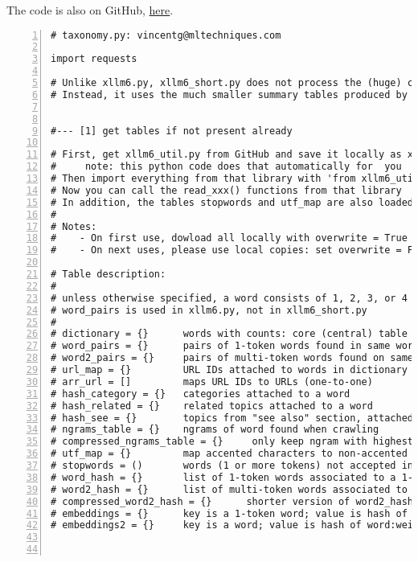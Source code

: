 \documentclass[oneside,10pt]{book}
\begin{document}
The code is also on GitHub, \href{https://github.com/VincentGranville/Large-Language-Models/blob/main/xllm6/build-taxonomy/taxonomy.py}{here}.
\vspace{1ex}

\begin{lstlisting}[numbers=left]
# taxonomy.py: vincentg@mltechniques.com

import requests

# Unlike xllm6.py, xllm6_short.py does not process the (huge) crawled data.
# Instead, it uses the much smaller summary tables produced by xllm6.py


#--- [1] get tables if not present already

# First, get xllm6_util.py from GitHub and save it locally as xllm6_util.py
#     note: this python code does that automatically for  you
# Then import everything from that library with 'from xllm6_util import *'
# Now you can call the read_xxx() functions from that library
# In addition, the tables stopwords and utf_map are also loaded
#
# Notes:
#    - On first use, dowload all locally with overwrite = True
#    - On next uses, please use local copies: set overwrite = False 

# Table description: 
#
# unless otherwise specified, a word consists of 1, 2, 3, or 4 tokens
# word_pairs is used in xllm6.py, not in xllm6_short.py
#
# dictionary = {}      words with counts: core (central) table
# word_pairs = {}      pairs of 1-token words found in same word, with count
# word2_pairs = {}     pairs of multi-token words found on same URL, with count 
# url_map = {}         URL IDs attached to words in dictionary
# arr_url = []         maps URL IDs to URLs (one-to-one)
# hash_category = {}   categories attached to a word
# hash_related = {}    related topics attached to a word
# hash_see = {}        topics from "see also" section, attached to word
# ngrams_table = {}    ngrams of word found when crawling
# compressed_ngrams_table = {}     only keep ngram with highest count
# utf_map = {}         map accented characters to non-accented version
# stopwords = ()       words (1 or more tokens) not accepted in dictionary
# word_hash = {}       list of 1-token words associated to a 1-token word 
# word2_hash = {}      list of multi-token words associated to a multi-token word 
# compressed_word2_hash = {}      shorter version of word2_hash 
# embeddings = {}      key is a 1-token word; value is hash of 1-token:weight
# embeddings2 = {}     key is a word; value is hash of word:weight
  


\end{lstlisting}
\end{document}
